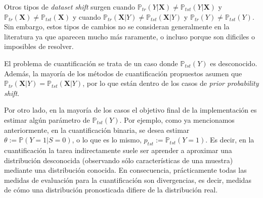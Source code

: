 Otros tipos de {\it dataset shift\/} surgen cuando
$\mathbb{P}_{tr}(Y|\boldsymbol{X}) \neq \mathbb{P}_{tst}(Y|\boldsymbol{X})$ y
$\mathbb{P}_{tr}(\boldsymbol{X}) \neq \mathbb{P}_{tst}(\boldsymbol{X})$ y cuando
$\mathbb{P}_{tr}(\boldsymbol{X}|Y) \neq \mathbb{P}_{tst}(\boldsymbol{X}|Y)$ y
$\mathbb{P}_{tr}(Y) \neq \mathbb{P}_{tst}(Y)$. Sin embargo, estos tipos de
cambios no se consideran generalmente en la literatura ya que aparecen mucho más
raramente, o incluso porque son dificiles o imposibles de resolver.

El problema de cuantificación se trata de un caso donde $\mathbb{P}_{tst}(Y)$ es
desconocido. Además, la mayoría de los métodos de cuantificación propuestos
asumen que $\mathbb{P}_{tr}(\boldsymbol{X}|Y) =
\mathbb{P}_{tst}(\boldsymbol{X}|Y)$, por lo que están dentro de los casos de
{\it prior probability shift}.

Por otro lado, en la mayoría de los casos el objetivo final de la implementación
es estimar algún parámetro de $\mathbb{P}_{tst}(Y)$. Por ejemplo, como ya
mencionamos anteriormente, en la cuantificación binaria, se desea estimar
$\theta:= \mathbb{P}(Y=1|S=0)$, o lo que es lo mismo, $p_{tst}:=
\mathbb{P}_{tst}(Y=1)$. Es decir, en la cuantificación la tarea indirectamente
suele ser aprender a aproximar una distribución desconocida (observando sólo
características de una muestra) mediante una distribución conocida. En
consecuencia, prácticamente todas las medidas de evaluación para la
cuantificación son divergencias, es decir, medidas de cómo una distribución
pronosticada difiere de la distribución real.

